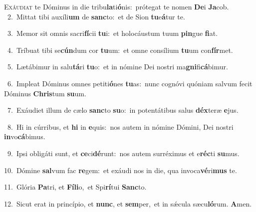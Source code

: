 \lettrine{\initial\textcolor{\initialcolor}{E}}{xáudiat} te Dóminus in die tribu\-\textbf{la}\-ti\-\textbf{ó}\-nis:~\star prótegat te nomen \textbf{De}\-i \textbf{Ja}\-cob.\\
{\numbfont\textcolor{\numbcolor}{~2.}}~Mittat tibi auxíli\textbf{um} de \textbf{sanc}\-to:~\star et de Sion \textbf{tu}\-e\-\textbf{á}\-tur te.\par
{\numbfont\textcolor{\numbcolor}{~3.}}~Memor sit omnis sacri\-\textbf{fí}\-cii \textbf{tu}\-i:~\star et holocáustum tuum \textbf{pin}\-gue \textbf{fi}\-at.\par
{\numbfont\textcolor{\numbcolor}{~4.}}~Tríbuat tibi se\-\textbf{cún}\-dum cor \textbf{tu}\-um:~\star et omne consílium \textbf{tu}\-um con\-\textbf{fír}\-met.\par
{\numbfont\textcolor{\numbcolor}{~5.}}~Lætábimur in salu\-\textbf{tá}\-ri \textbf{tu}\-o:~\star et in nómine Dei nostri ma\-\textbf{gni}\-fi\-\textbf{cá}\-bimur.\par
{\numbfont\textcolor{\numbcolor}{~6.}}~Impleat Dóminus omnes petiti\-\textbf{ó}\-nes \textbf{tu}\-as:~\star nunc cognóvi quóniam salvum fecit Dóminus \textbf{Chris}\-tum \textbf{su}\-um.\par
{\numbfont\textcolor{\numbcolor}{~7.}}~Exáudiet illum de cælo \textbf{sanc}\-to \textbf{su}\-o:~\star in potentátibus salus \textbf{déx}\-teræ \textbf{e}\-jus.\par
{\numbfont\textcolor{\numbcolor}{~8.}}~Hi in cúrribus, et \textbf{hi} in \textbf{e}\-quis:~\star nos autem in nómine Dómini, Dei nostri \textbf{in}\-vo\-\textbf{cá}\-bimus.\par
{\numbfont\textcolor{\numbcolor}{~9.}}~Ipsi obligáti sunt, et \textbf{ce}\-ci\-\textbf{dé}\-runt:~\star nos autem surréximus et e\-\textbf{réc}\-ti \textbf{su}\-mus.\par
{\numbfont\textcolor{\numbcolor}{10.}}~Dómine \textbf{sal}\-vum fac \textbf{re}\-gem:~\star et exáudi nos in die, qua invoca\-\textbf{vé}\-ri\textbf{mus} te.\par
{\numbfont\textcolor{\numbcolor}{11.}}~Glória \textbf{Pa}\-tri, et \textbf{Fí}\-\textbf{li}o,~\star et Spi\-\textbf{rí}\-tui \textbf{Sanc}\-to.\par
{\numbfont\textcolor{\numbcolor}{12.}}~Sicut erat in princípio, et \textbf{nunc}\-, et \textbf{sem}\-per,~\star et in sǽcula sæcu\-\textbf{ló}\-rum. \textbf{A}\-men.\par
